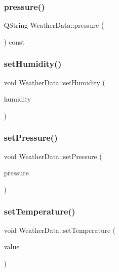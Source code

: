 \mbox{\label{class_weather_data_af726e713890bd6d310fe4a718dd69c77}} 
\subsubsection{\texorpdfstring{pressure()}{pressure()}}
{\footnotesize\ttfamily Q\+String Weather\+Data\+::pressure (\begin{DoxyParamCaption}{ }\end{DoxyParamCaption}) const}

\mbox{\label{class_weather_data_aad895695b5f0651c58657973f2140509}} 
\subsubsection{\texorpdfstring{set\+Humidity()}{setHumidity()}}
{\footnotesize\ttfamily void Weather\+Data\+::set\+Humidity (\begin{DoxyParamCaption}\item[{const Q\+String \&}]{humidity }\end{DoxyParamCaption})}

\mbox{\label{class_weather_data_ad5b453016656864e2bc3a09fc75919a0}} 
\subsubsection{\texorpdfstring{set\+Pressure()}{setPressure()}}
{\footnotesize\ttfamily void Weather\+Data\+::set\+Pressure (\begin{DoxyParamCaption}\item[{const Q\+String \&}]{pressure }\end{DoxyParamCaption})}

\mbox{\label{class_weather_data_afee514cbb8713059cf8d0602b33cadf5}} 
\subsubsection{\texorpdfstring{set\+Temperature()}{setTemperature()}}
{\footnotesize\ttfamily void Weather\+Data\+::set\+Temperature (\begin{DoxyParamCaption}\item[{const Q\+String \&}]{value }\end{DoxyParamCaption})}

